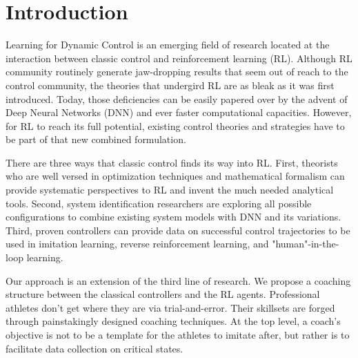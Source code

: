 \documentclass{IJCAS}
\begin{document}

\section{Introduction}
Learning for Dynamic Control is an emerging field of research located at the interaction between classic control and reinforcement learning (RL). Although RL community routinely generate jaw-dropping results that seem out of reach to the control community\cite{Dao2020AdaptiveRL}\cite{Zheng2020BalanceCF}\cite{Xin2020RobustES}\cite{Dornheim2018ModelfreeAO}, the theories that undergird RL are as bleak as it was first introduced\cite{Bertsekas1996NeuroDynamicP}. Today, those deficiencies can be easily papered over by the advent of Deep Neural Networks (DNN) and ever faster computational capacities. However, for RL to reach its full potential, existing control theories and strategies have to be part of that new combined formulation.

There are three ways that classic control finds its way into RL. First, theorists who are well versed in optimization techniques and mathematical formalism can provide systematic perspectives to RL and invent the much needed analytical tools\cite{Han2020ActorCriticRL}\cite{Weinan2017APO}\cite{Dupont2019AugmentedNO}\cite{Betancourt2018OnSO}\cite{Nachum2020ReinforcementLV}\cite{Lv2019ApproximateOS}. Second, system identification researchers are exploring all possible configurations to combine existing system models with DNN and its variations\cite{Hewing2020LearningBasedMP}\cite{Mohan2020EmbeddingHP}\cite{Lusch2018DeepLF}\cite{Bai2019DeepEM}\cite{BelbutePeres2020CombiningDP}\cite{Oh2020DeepRB}\cite{Cheng2019OnorbitRU}. Third, proven controllers can provide data on successful control trajectories to be used in imitation learning, reverse reinforcement learning, and "human"-in-the-loop learning\cite{Knox2009InteractivelySA}\cite{Knox2010CombiningMF}\cite{Peng2018DeepMimicED}\cite{Peng2020LearningAR}\cite{Paine2018OneShotHI}\cite{Choi2017InverseRL}.

Our approach is an extension of the third line of research. We propose a coaching structure between the classical controllers and the RL agents. Professional athletes don't get where they are via trial-and-error. Their skillsets are forged through painstakingly designed coaching techniques. At the top level, a coach's objective is not to be a template for the athletes to imitate after, but rather is to facilitate data collection on critical states. 
\end{document}
